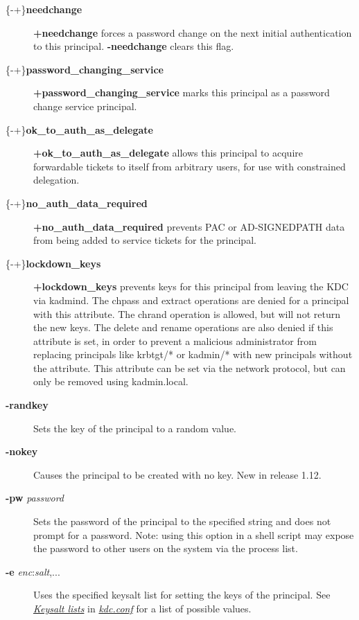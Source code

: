 \documentclass[letterpaper,10pt,english]{sphinxmanual}
\begin{document}
\begin{description}
\item[{\{-\textbar{}+\}\textbf{needchange}}] \leavevmode
\textbf{+needchange} forces a password change on the next initial
authentication to this principal.  \textbf{-needchange} clears this
flag.

\item[{\{-\textbar{}+\}\textbf{password\_changing\_service}}] \leavevmode
\textbf{+password\_changing\_service} marks this principal as a password
change service principal.

\item[{\{-\textbar{}+\}\textbf{ok\_to\_auth\_as\_delegate}}] \leavevmode
\textbf{+ok\_to\_auth\_as\_delegate} allows this principal to acquire
forwardable tickets to itself from arbitrary users, for use with
constrained delegation.

\item[{\{-\textbar{}+\}\textbf{no\_auth\_data\_required}}] \leavevmode
\textbf{+no\_auth\_data\_required} prevents PAC or AD-SIGNEDPATH data from
being added to service tickets for the principal.

\item[{\{-\textbar{}+\}\textbf{lockdown\_keys}}] \leavevmode
\textbf{+lockdown\_keys} prevents keys for this principal from leaving
the KDC via kadmind.  The chpass and extract operations are denied
for a principal with this attribute.  The chrand operation is
allowed, but will not return the new keys.  The delete and rename
operations are also denied if this attribute is set, in order to
prevent a malicious administrator from replacing principals like
krbtgt/* or kadmin/* with new principals without the attribute.
This attribute can be set via the network protocol, but can only
be removed using kadmin.local.

\item[{\textbf{-randkey}}] \leavevmode
Sets the key of the principal to a random value.

\item[{\textbf{-nokey}}] \leavevmode
Causes the principal to be created with no key.  New in release
1.12.

\item[{\textbf{-pw} \emph{password}}] \leavevmode
Sets the password of the principal to the specified string and
does not prompt for a password.  Note: using this option in a
shell script may expose the password to other users on the system
via the process list.

\item[{\textbf{-e} \emph{enc}:\emph{salt},...}] \leavevmode
Uses the specified keysalt list for setting the keys of the
principal.  See {\hyperref[admin/conf_files/kdc_conf:keysalt-lists]{\emph{Keysalt lists}}} in {\hyperref[admin/conf_files/kdc_conf:kdc-conf-5]{\emph{kdc.conf}}} for a
list of possible values.


\end{description}
\end{document}
